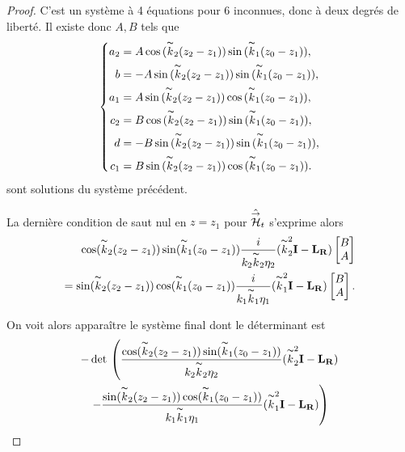 \begin{proof}
      C'est un système à 4 équations pour 6 inconnues, donc à deux degrés de liberté. Il existe donc \(A,B\) tels que
      \begin{equation*}
        \left\lbrace
        \begin{aligned}
        a_2 &= A\cos{(\overset{\thicksim}{k}_2(z_2-z_1))}\sin{(\overset{\thicksim}{k}_1(z_0-z_1))},
        \\
        b &= -A\sin{(\overset{\thicksim}{k}_2(z_2-z_1))}\sin{(\overset{\thicksim}{k}_1(z_0-z_1))},
        \\
        a_1 &= A\sin{(\overset{\thicksim}{k}_2(z_2-z_1))}\cos{(\overset{\thicksim}{k}_1(z_0-z_1))},
        \\
        c_2 &= B\cos{(\overset{\thicksim}{k}_2(z_2-z_1))}\sin{(\overset{\thicksim}{k}_1(z_0-z_1))},
        \\
        d &= -B\sin{(\overset{\thicksim}{k}_2(z_2-z_1))}\sin{(\overset{\thicksim}{k}_1(z_0-z_1))},
        \\
        c_1 &= B\sin{(\overset{\thicksim}{k}_2(z_2-z_1))}\cos{(\overset{\thicksim}{k}_1(z_0-z_1))}.
        \end{aligned}
        \right.
      \end{equation*}
      sont solutions du système précédent. 

      La dernière condition de saut nul en \(z=z_1\) pour \(\hat{{\overset{\rightarrow}{\mathcal{H}}}}_t\) s'exprime alors
      \begin{align*}
         \cos(\overset{\thicksim}{k}_2(z_2-z_1)) \sin(\overset{\thicksim}{k}_1(z_0-z_1))\dfrac{i}{k_2\overset{\thicksim}{k}_2\eta_2}(\overset{\thicksim}{k}_2^2 \mathbf{I} - \mathbf{L_R})\begin{bmatrix}B\\A\end{bmatrix}
        \\= 
         \sin(\overset{\thicksim}{k}_2(z_2-z_1)) \cos(\overset{\thicksim}{k}_1(z_0-z_1))\dfrac{i}{k_1\overset{\thicksim}{k}_1\eta_1}(\overset{\thicksim}{k}_1^2 \mathbf{I} - \mathbf{L_R})\begin{bmatrix}B\\A\end{bmatrix}.
      \end{align*}

      On voit alors apparaître le système final dont le déterminant est
      \begin{multline*}
        -\det{}\left(
        \dfrac{\cos(\overset{\thicksim}{k}_2(z_2-z_1)) \sin(\overset{\thicksim}{k}_1(z_0-z_1))}{k_2\overset{\thicksim}{k}_2\eta_2}(\overset{\thicksim}{k}_2^2 \mathbf{I} - \mathbf{L_R})
        \right.
        \\
        \left.-
         \dfrac{\sin(\overset{\thicksim}{k}_2(z_2-z_1)) \cos(\overset{\thicksim}{k}_1(z_0-z_1))}{k_1\overset{\thicksim}{k}_1\eta_1}(\overset{\thicksim}{k}_1^2 \mathbf{I} - \mathbf{L_R})
         \right)
      \end{multline*}

      \newcommand{\alp}{\frac{\cos(\kk_2(z_2-z_1)) \sin(\kk_1(z_0-z_1))}{k_2\kk_2\eta_2}}
      \newcommand{\bet}{\frac{\sin(\kk_2(z_2-z_1)) \cos(\kk_1(z_0-z_1))}{k_1\kk_1\eta_1}}


\end{proof}
